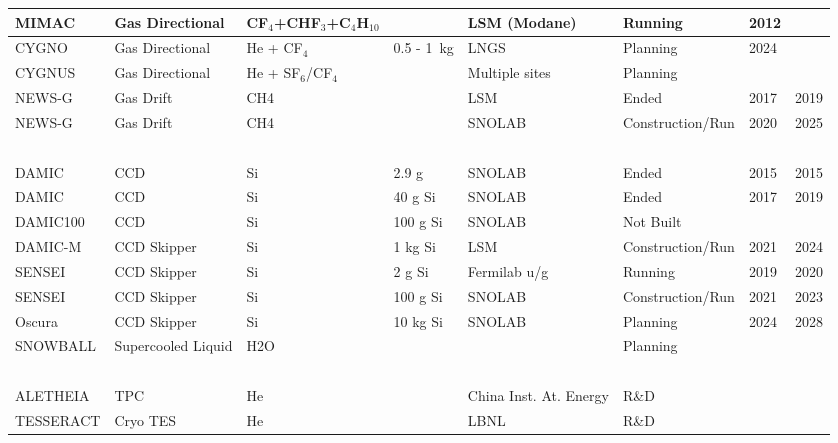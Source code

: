 \begin{table}[!ht]
\begin{tabular}{|l|l|l|l|l|l|l|l|}
        MIMAC & Gas Directional & CF$_4$+CHF$_3$+C$_4$H$_{10}$ & ~ & LSM (Modane) & Running & 2012& \\ \hline
        CYGNO & Gas Directional & He + CF$_4$ & 0.5 - 1~kg & LNGS & Planning & 2024 & ~ \\ \hline
        CYGNUS & Gas Directional & He + SF$_6$/CF$_4$ & ~ & Multiple sites & Planning & ~ & ~ \\ \hline
        NEWS-G & Gas Drift & CH4 & ~ & LSM & Ended & 2017 & 2019 \\ \hline
        NEWS-G & Gas Drift & CH4 & ~ & SNOLAB & Construction/Run & 2020 & 2025 \\ \hline
        ~ & ~ & ~ & ~ & ~ & ~ & ~ & ~ \\ \hline
        DAMIC & CCD & Si & 2.9 g & SNOLAB & Ended & 2015 & 2015 \\ \hline
        DAMIC & CCD & Si & 40 g Si & SNOLAB & Ended & 2017 & 2019 \\ \hline
        DAMIC100 & CCD & Si & 100 g Si & SNOLAB & Not Built & ~ & ~ \\ \hline
        DAMIC-M & CCD Skipper & Si & 1 kg Si & LSM & Construction/Run & 2021 & 2024 \\ \hline
        SENSEI & CCD Skipper & Si & 2 g Si & Fermilab u/g & Running & 2019 & 2020 \\ \hline
        SENSEI & CCD Skipper & Si & 100 g Si & SNOLAB & Construction/Run & 2021 & 2023 \\ \hline
        Oscura & CCD Skipper & Si & 10 kg Si & SNOLAB & Planning & 2024 & 2028 \\ \hline
        SNOWBALL & Supercooled Liquid & H2O & ~ & ~ & Planning & ~ & ~ \\ \hline
        ~ & ~ & ~ & ~ & ~ & ~ & ~ & ~ \\ \hline
        ALETHEIA & TPC & He & ~ & China Inst. At. Energy & R\&D & ~ & ~ \\ \hline
        TESSERACT & Cryo TES & He & ~ & LBNL & R\&D & ~ & ~ \\ \hline
    \end{tabular}
\end{table}

